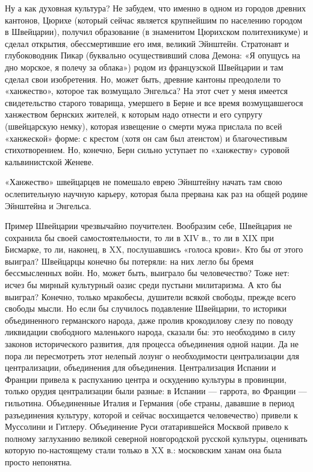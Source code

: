 Ну а как духовная культура? Не  забудем, что именно в одном из городов
древних  кантонов,  Цюрихе  (который  сейчас  является  крупнейшим  по
населению  городом в  Швейцарии),  получил  образование (в  знаменитом
Цюрихском  политехникуме)   и  сделал  открытия,   обессмертившие  его
имя,  великий Эйнштейн.  Стратонавт и  глубоководник Пикар  (буквально
осуществивший слова  Демона: «Я  опущусь на дно  морское, я  полечу за
облака») родом из французской Швейцарии и там сделал свои изобретения.
Но, может быть, древние кантоны преодолели то «ханжество», которое так
возмущало Энгельса? На этот счет  у меня имеется свидетельство старого
товарища,  умершего  в Берне  и  все  время возмущавшегося  ханжеством
бернских жителей,  к которым надо  отнести и его  супругу (швейцарскую
немку), которая извещение  о смерти мужа прислала  по всей «ханжеской»
форме:  с  крестом   (хотя  он  сам  был   атеистом)  и  благочестивым
стихотворением.  Но,  конечно,  Берн сильно  уступает  по  «ханжеству»
суровой кальвинистской Женеве.

«Ханжество»  швейцарцев не  помешало еврею  Эйнштейну начать  там свою
ослепительную научную карьеру, которая была  прервана как раз на общей
родине Эйнштейна и Энгельса.

Пример Швейцарии чрезвычайно поучителен.  Вообразим себе, Швейцария не
сохранила бы своей самостоятельности, то ли в  XIV в., то ли в XIX при
Бисмарке, то ли, наконец, в XX, послушавшись «голоса крови». Кто бы от
этого выиграл?  Швейцарцы конечно бы  потеряли: на них легло  бы бремя
бессмысленных  войн. Но,  может быть,  выиграло бы  человечество? Тоже
нет: исчез бы мирный культурный оазис среди пустыни милитаризма. А кто
бы выиграл? Конечно, только мракобесы, душители всякой свободы, прежде
всего свободы  мысли. Но  если бы  случилось подавление  Швейцарии, то
историки  объединенного германского  народа,  даже пролив  крокодилову
слезу по  поводу ликвидации свободного маленького  народа, сказали бы:
это  необходимо в  силу законов  исторического развития,  для процесса
объединения  одной нации.  Да  не пора  ли  пересмотреть этот  нелепый
лозунг  о необходимости  централизации для  централизации, объединения
для объединения. Централизация Испании  и Франции привела к распуханию
центра и  оскудению культуры в провинции,  только орудия централизации
были  разные:  в  Испании  ---  гаррота,  во  Франции  ---  гильотина.
Объединенные  Италия  и  Германия   (обе  страны,  дававшие  в  период
разъединения  культуру,  которой  и сейчас  восхищается  человечество)
привели к Муссолини и  Гитлеру. Объединение Руси отатарившейся Москвой
привело  к полному  заглуханию великой  северной новгородской  русской
культуры,  оценивать  которую  по-настоящему  стали только  в  XX  в.:
московским ханам она была просто непонятна.

